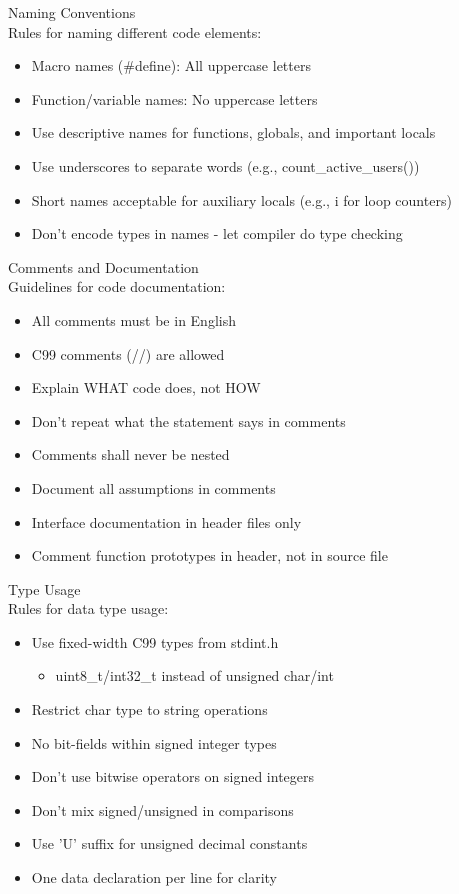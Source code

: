 \begin{concept}{Naming Conventions}\\
Rules for naming different code elements:
\begin{itemize}
  \item Macro names (\#define): All uppercase letters
  \item Function/variable names: No uppercase letters
  \item Use descriptive names for functions, globals, and important locals
  \item Use underscores to separate words (e.g., count\_active\_users())
  \item Short names acceptable for auxiliary locals (e.g., i for loop counters)
  \item Don't encode types in names - let compiler do type checking
\end{itemize}
\end{concept}

\begin{concept}{Comments and Documentation}\\
Guidelines for code documentation:
\begin{itemize}
  \item All comments must be in English
  \item C99 comments (//) are allowed
  \item Explain WHAT code does, not HOW
  \item Don't repeat what the statement says in comments
  \item Comments shall never be nested
  \item Document all assumptions in comments
  \item Interface documentation in header files only
  \item Comment function prototypes in header, not in source file
\end{itemize}
\end{concept}

\begin{concept}{Type Usage}\\
Rules for data type usage:
\begin{itemize}
  \item Use fixed-width C99 types from stdint.h
    \begin{itemize}
      \item uint8\_t/int32\_t instead of unsigned char/int
    \end{itemize}
  \item Restrict char type to string operations
  \item No bit-fields within signed integer types
  \item Don't use bitwise operators on signed integers
  \item Don't mix signed/unsigned in comparisons
  \item Use 'U' suffix for unsigned decimal constants
  \item One data declaration per line for clarity
\end{itemize}
\end{concept}

